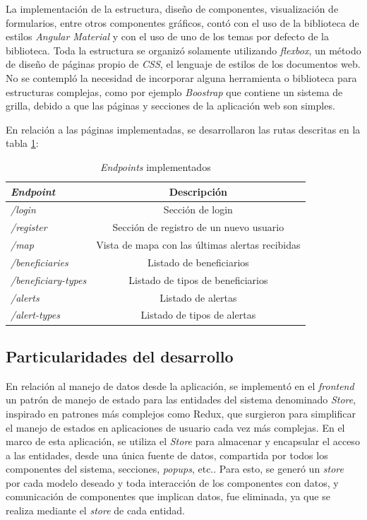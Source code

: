 La implementación de la estructura, diseño de componentes, visualización de formularios, entre otros componentes gráficos, contó con el uso de la biblioteca de estilos \textit{Angular Material} y con el uso de uno de los temas por defecto de la biblioteca. Toda la estructura se organizó solamente utilizando \textit{flexbox}, un método de diseño de páginas propio de \textit{CSS}, el lenguaje de estilos de los documentos web\citep{CSS:1}. No se contempló la necesidad de incorporar alguna herramienta o biblioteca para estructuras complejas, como por ejemplo \textit{Boostrap} que contiene un sistema de grilla\citep{BOOTSTRAP:1}, debido a que las páginas y secciones de la aplicación web son simples.

En relación a las páginas implementadas, se desarrollaron las rutas descritas en la tabla \ref{tab:frontend:pages}:

\begin{table}[H]
	\centering
	\caption[\textit{Servicios}]{\textit{Endpoints} implementados}
	\begin{tabular}{l c}    
		\toprule
		\textbf{\textit{Endpoint}} 	 & \textbf{Descripción} \\
		\midrule
		\textit{/login} & Sección de login  \\	
		\textit{/register} & Sección de registro de un nuevo usuario \\		
		\textit{/map} & Vista de mapa con las últimas alertas recibidas  \\
		\textit{/beneficiaries} & Listado de beneficiarios  \\	
		\textit{/beneficiary-types} & Listado de tipos de beneficiarios  \\		
		\textit{/alerts} & Listado de alertas  \\
		\textit{/alert-types} & Listado de tipos de alertas  \\		
		\bottomrule
		\hline
	\end{tabular}
	\label{tab:frontend:pages}
\end{table}

\subsection{Particularidades del desarrollo}

En relación al manejo de datos desde la aplicación, se implementó en el \textit{frontend} un patrón de manejo de estado para las entidades del sistema denominado \textit{Store}, inspirado en patrones más complejos como Redux, que surgieron para simplificar el manejo de estados en aplicaciones de usuario cada vez más complejas. En el marco de esta aplicación, se utiliza el \textit{Store} para almacenar y encapsular el acceso a las entidades, desde una única fuente de datos, compartida por todos los componentes del sistema, secciones, \textit{popups}, etc.\citep{ANGULAR:6}. Para esto, se generó un \textit{store} por cada modelo deseado y toda interacción de los componentes con datos, y comunicación de componentes que implican datos, fue eliminada, ya que se realiza mediante el \textit{store} de cada entidad.


